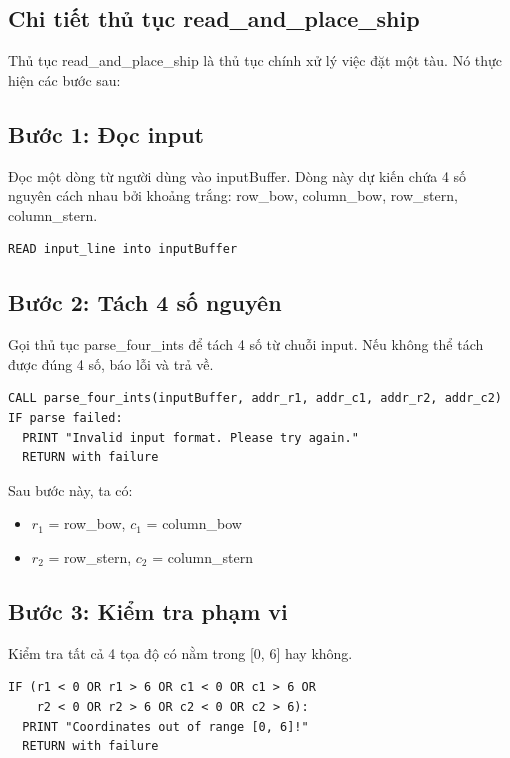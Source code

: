 \subsection{Chi tiết thủ tục read\_and\_place\_ship}

Thủ tục read\_and\_place\_ship là thủ tục chính xử lý việc đặt một tàu. Nó thực hiện các bước sau:

\subsection{Bước 1: Đọc input}

Đọc một dòng từ người dùng vào inputBuffer. Dòng này dự kiến chứa 4 số nguyên cách nhau bởi khoảng trắng: row\_bow, column\_bow, row\_stern, column\_stern.

\begin{verbatim}
READ input_line into inputBuffer
\end{verbatim}

\subsection{Bước 2: Tách 4 số nguyên}

Gọi thủ tục parse\_four\_ints để tách 4 số từ chuỗi input. Nếu không thể tách được đúng 4 số, báo lỗi và trả về.

\begin{verbatim}
CALL parse_four_ints(inputBuffer, addr_r1, addr_c1, addr_r2, addr_c2)
IF parse failed:
  PRINT "Invalid input format. Please try again."
  RETURN with failure
\end{verbatim}

Sau bước này, ta có:
\begin{itemize}
    \item $r_1$ = row\_bow, $c_1$ = column\_bow
    \item $r_2$ = row\_stern, $c_2$ = column\_stern
\end{itemize}

\subsection{Bước 3: Kiểm tra phạm vi}

Kiểm tra tất cả 4 tọa độ có nằm trong [0, 6] hay không.

\begin{verbatim}
IF (r1 < 0 OR r1 > 6 OR c1 < 0 OR c1 > 6 OR
    r2 < 0 OR r2 > 6 OR c2 < 0 OR c2 > 6):
  PRINT "Coordinates out of range [0, 6]!"
  RETURN with failure
\end{verbatim}

